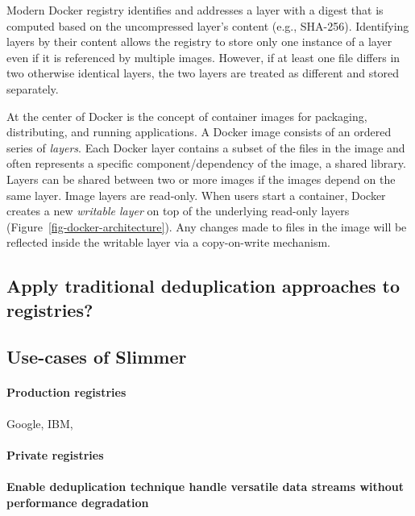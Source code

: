 Modern Docker registry identifies and addresses a layer with a digest that is computed based on the uncompressed layer's content (e.g., SHA-256).
Identifying layers by their content allows the registry to store only one instance of a layer even if it is referenced by multiple images. 
However, if at least one file differs in two otherwise identical layers, the two layers are treated as different and stored separately.

At the center of Docker is the concept of container images for packaging, distributing, and running applications.
A Docker image consists of an ordered series of \emph{layers}.
Each Docker layer contains a subset of the files in the image and often represents a specific component/dependency of the image, \eg a shared library.
Layers can be shared between two or more images if the images depend on the same layer.
Image layers are read-only.
When users start a container, Docker creates a new \emph{writable layer} on top of the underlying read-only layers (Figure~\ref{fig-docker-architecture}).
Any changes made to files in the image will be reflected inside the writable layer via a copy-on-write mechanism.

\subsection{Apply traditional deduplication approaches to registries?}



\subsection{Use-cases of Slimmer}

\paragraph{Production registries} Google, IBM,

\paragraph{Private registries}

\paragraph{Enable deduplication technique handle versatile data streams without performance degradation}


